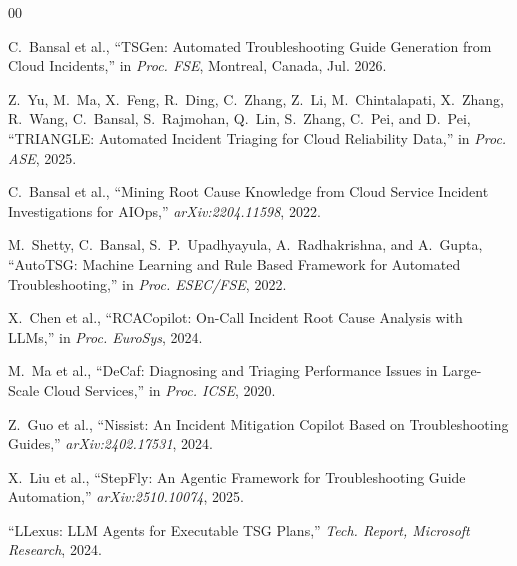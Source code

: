 \documentclass[conference]{IEEEtran}
\begin{document}
\begin{thebibliography}{00}

C.~Bansal et al.,
``TSGen: Automated Troubleshooting Guide Generation from Cloud Incidents,''
in \textit{Proc. FSE}, Montreal, Canada, Jul. 2026.

Z.~Yu, M.~Ma, X.~Feng, R.~Ding, C.~Zhang, Z.~Li, M.~Chintalapati, X.~Zhang,
R.~Wang, C.~Bansal, S.~Rajmohan, Q.~Lin, S.~Zhang, C.~Pei, and D.~Pei,
``TRIANGLE: Automated Incident Triaging for Cloud Reliability Data,''
in \textit{Proc. ASE}, 2025.

C.~Bansal et al.,
``Mining Root Cause Knowledge from Cloud Service Incident Investigations for AIOps,''
\textit{arXiv:2204.11598}, 2022.

M.~Shetty, C.~Bansal, S.~P.~Upadhyayula, A.~Radhakrishna, and A.~Gupta,
``AutoTSG: Machine Learning and Rule Based Framework for Automated Troubleshooting,''
in \textit{Proc. ESEC/FSE}, 2022.

X.~Chen et al.,
``RCACopilot: On-Call Incident Root Cause Analysis with LLMs,''
in \textit{Proc. EuroSys}, 2024.

M.~Ma et al.,
``DeCaf: Diagnosing and Triaging Performance Issues in Large-Scale Cloud Services,''
in \textit{Proc. ICSE}, 2020.

Z.~Guo et al.,
``Nissist: An Incident Mitigation Copilot Based on Troubleshooting Guides,''
\textit{arXiv:2402.17531}, 2024.

X.~Liu et al.,
``StepFly: An Agentic Framework for Troubleshooting Guide Automation,''
\textit{arXiv:2510.10074}, 2025.

``LLexus: LLM Agents for Executable TSG Plans,''
\textit{Tech. Report, Microsoft Research}, 2024.

\end{thebibliography}
\end{document}

